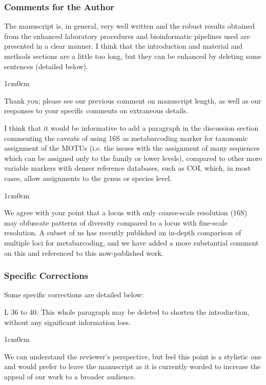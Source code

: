 \documentclass{article}
\newenvironment{response}
	{
	\begin{adjustwidth}{1cm}{0cm}
	\color{peerjBlue}
	}
	{
	\end{adjustwidth}
	}
\begin{document}
\subsubsection*{Comments for the Author}
The manuscript is, in general, very well written and the robust results obtained from the enhanced laboratory procedures and bioinformatic pipelines used are presented in a clear manner. I think that the introduction and material and methods sections are a little too long, but they can be enhanced by deleting some sentences (detailed below).
\begin{response}
	Thank you; please see our previous comment on manuscript length, as well as our responses to your specific comments on extraneous details.\\
\end{response}


I think that it would be informative to add a paragraph in the discussion section commenting the caveats of using 16S as metabarcoding marker for taxonomic assignment of the MOTUs (i.e. the issues with the assignment of many sequences which can be assigned only to the family or lower levels), compared to other more variable markers with denser reference databases, such as COI, which, in most cases, allow assignments to the genus or species level.
\begin{response}
	We agree with your point that a locus with only coarse-scale resolution (16S) may obfuscate patterns of diversity compared to a locus with fine-scale resolution. A subset of us has recently published an in-depth comparison of multiple loci for metabarcoding, and we have added a more substantial comment on this and referenced to this now-published work.
\\
\end{response}

\subsubsection*{Specific Corrections}
Some specific corrections are detailed below:

L 36 to 40. This whole paragraph may be deleted to shorten the introduction, without any significant information loss.
\begin{response}
  We can understand the reviewer's perspective, but feel this point is a stylistic one and would prefer to leave the manuscript as it is currently worded to increase the appeal of our work to a broader audience.\\
\end{response}
\end{document}
